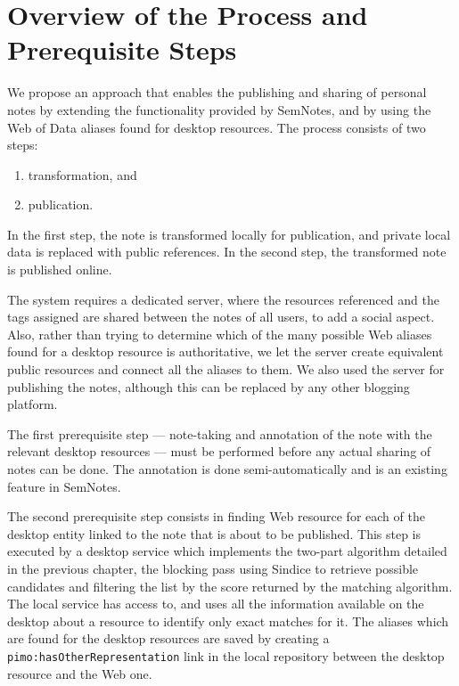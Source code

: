 \section{Overview of the Process and Prerequisite Steps}
\label{sec:sembloggingapproach}

We propose an approach that enables the publishing and sharing of personal notes by extending the functionality provided by SemNotes, and by using the Web of Data aliases found for desktop resources. The process consists of two steps: 
\begin{enumerate} 
 \item transformation, and 
 \item publication. 
\end{enumerate}
In the first step, the note is transformed locally for publication, and private local data is replaced with public references.
In the second step, the transformed note is published online.

The system requires a dedicated server, where the resources referenced and the tags assigned are shared between the notes of all users, to add a social aspect. Also, rather than trying to determine which of the many possible Web aliases found for a desktop resource is authoritative, we let the server create equivalent public resources and connect all the aliases to them. We also used the server for publishing the notes, although this can be replaced by any other blogging platform.

The first prerequisite step --- note-taking and annotation of the note with the relevant desktop resources --- must be performed before any actual sharing of notes can be done. The annotation is done semi-automatically and is an existing feature in SemNotes. 

The second prerequisite step consists in finding Web resource for each of the desktop entity linked to the note that is about to be published. This step is executed by a desktop service which implements the two-part algorithm detailed in the previous chapter, the blocking pass using Sindice to retrieve possible candidates and filtering the list by the score returned by the matching algorithm. The local service has access to, and uses all the information available on the desktop about a resource to identify only exact matches for it. The aliases which are found for the desktop resources are saved by creating a \verb|pimo:hasOtherRepresentation| link in the local repository between the desktop resource and the Web one.
